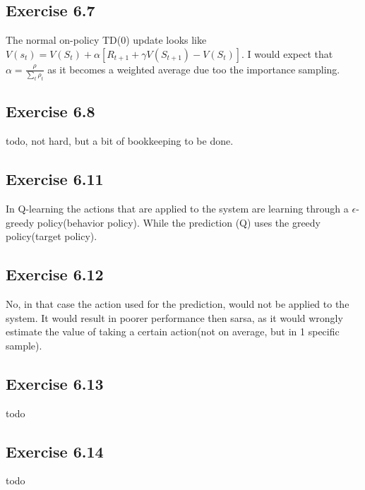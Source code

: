 \subsection{Exercise 6.7}
The normal on-policy TD(0) update looks like $V(s_t) = V(S_t) + \alpha[R_{t+1}+\gamma V(S_{t+1}) - V(S_t)]$. I would expect that $\alpha=\frac{\rho}{\sum_t \rho_t }$ as it becomes a weighted average due too the importance sampling.

\subsection{Exercise 6.8}
todo, not hard, but a bit of bookkeeping to be done.

\subsection{Exercise 6.11}
In Q-learning the actions that are applied to the system are learning through a $\epsilon$-greedy policy(behavior policy). While the prediction (Q) uses the greedy policy(target policy). 

\subsection{Exercise 6.12}
No, in that case the action used for the prediction, would not be applied to the system. It would result in poorer performance then sarsa, as it would wrongly estimate the value of taking a certain action(not on average, but in 1 specific sample).

\subsection{Exercise 6.13}
todo

\subsection{Exercise 6.14}
todo